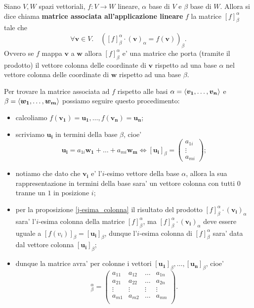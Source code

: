 \begin{definition}\label{matrice_associata}
    Siano $V, W$ spazi vettoriali, $f : V \to W$ lineare, $\alpha$ base di $V$ e $\beta$ base di $W$. Allora si dice chiama \textbf{matrice associata all'applicazione lineare} $f$ la matrice $[f]^{\alpha}_{\beta}$ tale che
    \begin{equation}
        \forall \bm{v} \in V. \quad \left( [f]^{\alpha}_{\beta} \cdot (\bm{v})_{\alpha}= f(\bm{v}) \right)_{\beta}.
    \end{equation}
    Ovvero se $f$ mappa $\bm{v}$ a $\bm{w}$ allora $[f]^{\alpha}_{\beta}$ e' una matrice che porta (tramite il prodotto) il vettore colonna delle coordinate di $\bm{v}$ rispetto ad una base $\alpha$ nel vettore colonna delle coordinate di $\bm{w}$ rispetto ad una base $\beta$.
\end{definition}

Per trovare la matrice associata ad $f$ rispetto alle basi $\alpha = \left\langle \bm{v_1}, \dots, \bm{v_n} \right\rangle$ e $\beta = \left\langle \bm{w_1}, \dots, \bm{w_m} \right\rangle$ possiamo seguire questo procedimento:
\begin{itemize}
    \item calcoliamo $f(\bm{v_1}) = \bm{u_1}, \dots, f(\bm{v_n}) = \bm{u_n}$;
    \item scriviamo $\bm{u_i}$ in termini della base $\beta$, cioe' \begin{equation*}
        \bm{u_i} = a_{1i}\bm{w_1} + \dots + a_{mi}\bm{w_m} \iff [\bm{u_i}]_{\beta} = \begin{pmatrix}
            a_{1i} \\ \vdots \\ a_{mi}
        \end{pmatrix};
    \end{equation*}
    \item notiamo che dato che $\bm{v_i}$ e' l'$i$-esimo vettore della base $\alpha$, allora la sua rappresentazione in termini della base sara' un vettore colonna con tutti $0$ tranne un $1$ in posizione $i$;
    \item per la proposizione \ref{j-esima_colonna} il risultato del prodotto $[f]^{\alpha}_{\beta} \cdot (\bm{v_i})_{\alpha}$ sara' l'$i$-esima colonna della matrice $[f]^{\alpha}_{\beta}$, ma $[f]^{\alpha}_{\beta} \cdot (\bm{v_i})_{\alpha}$ deve essere uguale a $[f(v_i)]_{\beta} = [\bm{u_i}]_{\beta}$, dunque l'$i$-esima colonna di $[f]^{\alpha}_{\beta}$ sara' data dal vettore colonna $[\bm{u_i}]_{\beta}$;
    \item dunque la matrice avra' per colonne i vettori $[\bm{u_1}]_{\beta}, \dots, [\bm{u_n}]_{\beta}$, cioe'
    \begin{equation}
        [f]^{\alpha}_{\beta} = \begin{pmatrix}
            a_{11} & a_{12} & \dots & a_{1n} \\
            a_{21} & a_{22} & \dots & a_{2n} \\
            \vdots & \vdots & \vdots& \vdots \\
            a_{m1} & a_{m2} & \dots & a_{mn} \\
        \end{pmatrix}.
    \end{equation}
\end{itemize}


